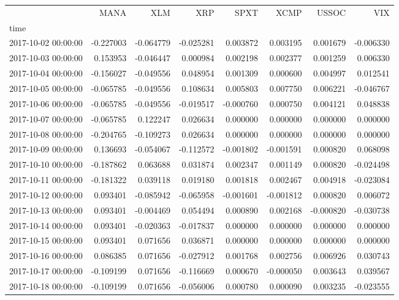 \begin{tabular}{lrrrrrrr}
\toprule
 & MANA & XLM & XRP & SPXT & XCMP & USSOC & VIX \\
time &  &  &  &  &  &  &  \\
\midrule
2017-10-02 00:00:00 & -0.227003 & -0.064779 & -0.025281 & 0.003872 & 0.003195 & 0.001679 & -0.006330 \\
2017-10-03 00:00:00 & 0.153953 & -0.046447 & 0.000984 & 0.002198 & 0.002377 & 0.001259 & 0.006330 \\
2017-10-04 00:00:00 & -0.156027 & -0.049556 & 0.048954 & 0.001309 & 0.000600 & 0.004997 & 0.012541 \\
2017-10-05 00:00:00 & -0.065785 & -0.049556 & 0.108634 & 0.005803 & 0.007750 & 0.006221 & -0.046767 \\
2017-10-06 00:00:00 & -0.065785 & -0.049556 & -0.019517 & -0.000760 & 0.000750 & 0.004121 & 0.048838 \\
2017-10-07 00:00:00 & -0.065785 & 0.122247 & 0.026634 & 0.000000 & 0.000000 & 0.000000 & 0.000000 \\
2017-10-08 00:00:00 & -0.204765 & -0.109273 & 0.026634 & 0.000000 & 0.000000 & 0.000000 & 0.000000 \\
2017-10-09 00:00:00 & 0.136693 & -0.054067 & -0.112572 & -0.001802 & -0.001591 & 0.000820 & 0.068098 \\
2017-10-10 00:00:00 & -0.187862 & 0.063688 & 0.031874 & 0.002347 & 0.001149 & 0.000820 & -0.024498 \\
2017-10-11 00:00:00 & -0.181322 & 0.039118 & 0.019180 & 0.001818 & 0.002467 & 0.004918 & -0.023084 \\
2017-10-12 00:00:00 & 0.093401 & -0.085942 & -0.065958 & -0.001601 & -0.001812 & 0.000820 & 0.006072 \\
2017-10-13 00:00:00 & 0.093401 & -0.004469 & 0.054494 & 0.000890 & 0.002168 & -0.000820 & -0.030738 \\
2017-10-14 00:00:00 & 0.093401 & -0.020363 & -0.017837 & 0.000000 & 0.000000 & 0.000000 & 0.000000 \\
2017-10-15 00:00:00 & 0.093401 & 0.071656 & 0.036871 & 0.000000 & 0.000000 & 0.000000 & 0.000000 \\
2017-10-16 00:00:00 & 0.086385 & 0.071656 & -0.027912 & 0.001768 & 0.002756 & 0.006926 & 0.030743 \\
2017-10-17 00:00:00 & -0.109199 & 0.071656 & -0.116669 & 0.000670 & -0.000050 & 0.003643 & 0.039567 \\
2017-10-18 00:00:00 & -0.109199 & 0.071656 & -0.056006 & 0.000780 & 0.000090 & 0.003235 & -0.023555 \\

\end{tabular}
